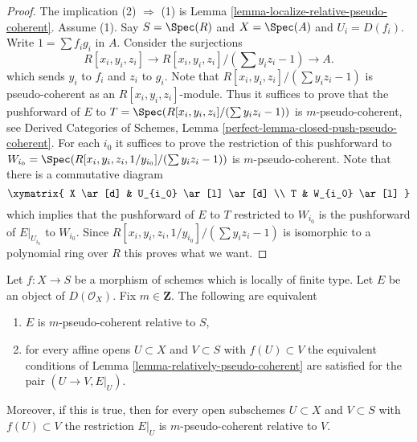 \begin{proof}
The implication (2) $\Rightarrow$ (1) is
Lemma \ref{lemma-localize-relative-pseudo-coherent}.
Assume (1). Say $S = \Spec(R)$ and $X = \Spec(A)$ and
$U_i = D(f_i)$. Write $1 = \sum f_ig_i$ in $A$.
Consider the surjections
$$
R[x_i, y_i, z_i] \to R[x_i, y_i, z_i]/(\sum y_iz_i - 1) \to A.
$$
which sends $y_i$ to $f_i$ and $z_i$ to $g_i$. Note that
$R[x_i, y_i, z_i]/(\sum y_iz_i - 1)$ is pseudo-coherent as an
$R[x_i, y_i, z_i]$-module. Thus it suffices to prove that
the pushforward of $E$ to $T = \Spec(R[x_i, y_i, z_i]/(\sum y_iz_i - 1))$
is $m$-pseudo-coherent, see
Derived Categories of Schemes,
Lemma \ref{perfect-lemma-closed-push-pseudo-coherent}.
For each $i_0$ it suffices to prove the restriction of this
pushforward to
$W_{i_0} = \Spec(R[x_i, y_i, z_i, 1/y_{i_0}]/(\sum y_iz_i - 1))$
is $m$-pseudo-coherent. Note that there is a commutative diagram
$$
\xymatrix{
X \ar[d] & U_{i_0} \ar[l] \ar[d] \\
T & W_{i_0} \ar[l]
}
$$
which implies that the pushforward of $E$ to $T$ restricted to $W_{i_0}$
is the pushforward of $E|_{U_{i_0}}$ to $W_{i_0}$. Since
$R[x_i, y_i, z_i, 1/y_{i_0}]/(\sum y_iz_i - 1)$ is isomorphic
to a polynomial ring over $R$ this proves what we want.
\end{proof}

\begin{lemma}
\label{lemma-relative-pseudo-coherence-characterize}
Let $f : X \to S$ be a morphism of schemes which is locally of finite type.
Let $E$ be an object of $D(\mathcal{O}_X)$.
Fix $m \in \mathbf{Z}$. The following are equivalent
\begin{enumerate}
\item $E$ is $m$-pseudo-coherent relative to $S$,
\item for every affine opens $U \subset X$ and $V \subset S$
with $f(U) \subset V$ the equivalent conditions of
Lemma \ref{lemma-relatively-pseudo-coherent}
are satisfied for the pair $(U \to V, E|_U)$.
\end{enumerate}
Moreover, if this is true, then for every open subschemes
$U \subset X$ and $V \subset S$ with $f(U) \subset V$
the restriction $E|_U$ is $m$-pseudo-coherent relative to $V$.
\end{lemma}

